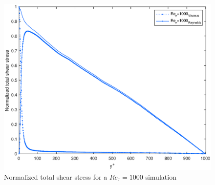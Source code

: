 \begin{figure}
\begin{center}
\includegraphics[scale=0.55]{grafici/stresses_1000.eps}
\caption{Normalized total shear stress for a $Re_{\tau}=1000$ simulation}
\label{stresses:1000}
\end{center} 
\end{figure}